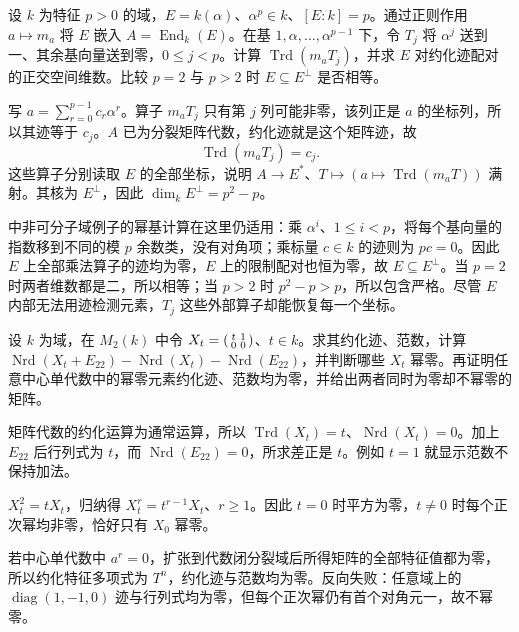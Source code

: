 \begin{exercise}\label{b2:ex:18-inseparable-field-trace}
	设 \(k\) 为特征 \(p>0\) 的域，\(E=k(\alpha)\)、\(\alpha^p\in k\)、\([E:k]=p\)。通过正则作用 \(a\mapsto m_a\) 将 \(E\) 嵌入 \(A=\operatorname{End}_k(E)\)。在基 \(1,\alpha,\ldots,\alpha^{p-1}\) 下，令 \(T_j\) 将 \(\alpha^j\) 送到一、其余基向量送到零，\(0\le j<p\)。计算 \(\operatorname{Trd}(m_aT_j)\)，并求 \(E\) 对约化迹配对的正交空间维数。比较 \(p=2\) 与 \(p>2\) 时 \(E\subseteq E^\perp\) 是否相等。
\end{exercise}
\begin{solution}
	写 \(a=\sum_{r=0}^{p-1}c_r\alpha^r\)。算子 \(m_aT_j\) 只有第 \(j\) 列可能非零，该列正是 \(a\) 的坐标列，所以其迹等于 \(c_j\)。\(A\) 已为分裂矩阵代数，约化迹就是这个矩阵迹，故
	\[
		\operatorname{Trd}(m_aT_j)=c_j.
	\]
	这些算子分别读取 \(E\) 的全部坐标，说明 \(A\to E^*\)、\(T\mapsto(a\mapsto\operatorname{Trd}(m_aT))\) 满射。其核为 \(E^\perp\)，因此 \(\dim_kE^\perp=p^2-p\)。

	中非可分子域例子的幂基计算在这里仍适用：乘 \(\alpha^i\)、\(1\le i<p\)，将每个基向量的指数移到不同的模 \(p\) 余数类，没有对角项；乘标量 \(c\in k\) 的迹则为 \(pc=0\)。因此 \(E\) 上全部乘法算子的迹均为零，\(E\) 上的限制配对也恒为零，故 \(E\subseteq E^\perp\)。当 \(p=2\) 时两者维数都是二，所以相等；当 \(p>2\) 时 \(p^2-p>p\)，所以包含严格。尽管 \(E\) 内部无法用迹检测元素，\(T_j\) 这些外部算子却能恢复每一个坐标。
\end{solution}

\begin{exercise}\label{b2:ex:18-norm-nonlinearity-nilpotents}
	设 \(k\) 为域，在 \(M_2(k)\) 中令 \(X_t=\begin{psmallmatrix}t&1\\0&0\end{psmallmatrix}\)、\(t\in k\)。求其约化迹、范数，计算 \(\operatorname{Nrd}(X_t+E_{22})-\operatorname{Nrd}(X_t)-\operatorname{Nrd}(E_{22})\)，并判断哪些 \(X_t\) 幂零。再证明任意中心单代数中的幂零元素约化迹、范数均为零，并给出两者同时为零却不幂零的矩阵。
\end{exercise}
\begin{solution}
	矩阵代数的约化运算为通常运算，所以 \(\operatorname{Trd}(X_t)=t\)、\(\operatorname{Nrd}(X_t)=0\)。加上 \(E_{22}\) 后行列式为 \(t\)，而 \(\operatorname{Nrd}(E_{22})=0\)，所求差正是 \(t\)。例如 \(t=1\) 就显示范数不保持加法。

	\(X_t^2=tX_t\)，归纳得 \(X_t^r=t^{r-1}X_t\)、\(r\ge1\)。因此 \(t=0\) 时平方为零，\(t\ne0\) 时每个正次幂均非零，恰好只有 \(X_0\) 幂零。

	若中心单代数中 \(a^r=0\)，扩张到代数闭分裂域后所得矩阵的全部特征值都为零，所以约化特征多项式为 \(T^n\)，约化迹与范数均为零。反向失败：任意域上的 \(\operatorname{diag}(1,-1,0)\) 迹与行列式均为零，但每个正次幂仍有首个对角元一，故不幂零。
\end{solution}

